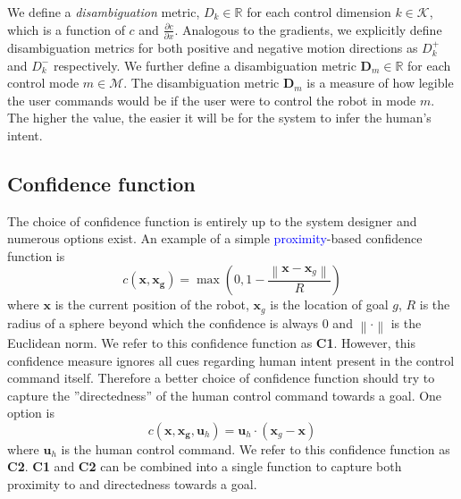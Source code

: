 \documentclass[conference]{IEEEtran}
\newcommand{\norm}[1]{\left\lVert#1\right\rVert}
\begin{document}
We define a \textit{disambiguation} metric, $D_{k}\in \mathbb{R}$ for each control dimension $k \in \mathcal{K}$, which is a function of $c$ and $\frac{\partial c}{\partial x}$. Analogous to the gradients, we explicitly define disambiguation metrics for both positive and negative motion directions as $D_{k}^{+}$ and $D_{k}^{-}$ respectively.
We further define a disambiguation metric $\boldsymbol{D}_m \in \mathbb{R}$ for each control mode $m \in \mathcal{M}$.
The disambiguation metric $\boldsymbol{D}_m$ is a measure of how legible the user commands would be if the user were to control the robot in mode $m$. The higher the value, the easier it will be for the system to infer the human's intent. 
\subsection{Confidence function}\label{CF}
The choice of confidence function is entirely up to the system designer and numerous options exist. An example of a simple \textcolor{blue}{proximity}-based confidence function is
\begin{equation*}\label{EQ1}
c(\boldsymbol{x}, \boldsymbol{x_g}) = \max(0, 1 - \frac{\norm{\boldsymbol{x} - \boldsymbol{x}_{g}}}{R})
\end{equation*}
where $\boldsymbol{x}$ is the current position of the robot, $\boldsymbol{x}_{g}$ is the location of goal $g$, $R$ is the radius of a sphere beyond which the confidence is always $0$ and $\norm{\cdot}$ is the Euclidean norm. We refer to this confidence function as \textbf{C1}. However, this confidence measure ignores all cues regarding human intent present in the control command itself. Therefore a better choice of confidence function should try to capture the ''directedness'' of the human control command towards a goal. One option is
\begin{equation*}\label{EQ2}
c({\boldsymbol{x},\boldsymbol{x_g}, \boldsymbol{u}_{h}}) = \boldsymbol{u}_h\cdot(\boldsymbol{x}_{g} - \boldsymbol{x})
\end{equation*}
where $\boldsymbol{u}_h$ is the human control command. We refer to this confidence function as \textbf{C2}. \textbf{C1} and \textbf{C2} can be combined into a single function to capture both proximity to and directedness towards a goal.
\end{document}
